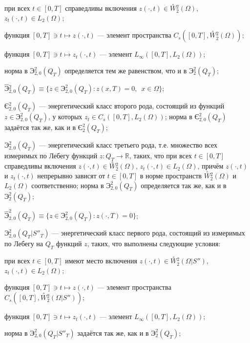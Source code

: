 \documentclass{report}
\begin{document}
при всех $t\in[0,T]$ справедливы включения $z(\cdot,t)\in\stackrel{\circ}{W}\!\!^2_2(\Omega)$, $z_t(\cdot,t)\in L_2(\Omega)$;

функция $[0,T]\ni t\mapsto z(\cdot,t)$ --- элемент пространства $C_s([0,T],\stackrel{\circ}{W}\!\!^2_2(\Omega))$;

функция  $[0,T]\ni t\mapsto z_t(\cdot,t)$ --- элемент $L_\infty([0,T],L_2(\Omega))$;

\noindent норма в  $\textrm{Э}^{2}_{2,0}(Q_T)$ определяется тем же равенством, что и в $\textrm{Э}^{2}_{2}(Q_T)$;


$\hat{\textrm{Э}}{}^{2}_{2,0}(Q_T)\equiv\{z\in \textrm{Э}^{2}_{2,0}(Q_T):z(x,T)=0,\,\,\,x\in\Omega\}$;


$\textrm{Є}^{2}_{2,0}(Q_T)$ --- \glqq энергетический класс второго рода\grqq, состоящий из функций $z\in \textrm{Э}^{2}_{2,0}(Q_T)$, у которых
$z_t\in C_s([0,T],L_2(\Omega))$; норма в $\textrm{Є}^{2}_{2,0}(Q_T)$ задаётся так же, как и в $\textrm{Є}^{2}_{2}(Q_T)$;


$\textbf{Э}^{2}_{2,0}(Q_T)$ --- \glqq энергетический класс третьего рода\grqq, т.е. множество всех измеримых по Лебегу функций $z\colon Q_T\to \mathbb{R}$, таких, что при всех $t\in[0,T]$
справедливы включения $z(\cdot,t)\in\stackrel{\circ}{W}\!\!\!^2_2(\Omega)$, $z_t(\cdot,t)\in L_2(\Omega)$, причём $z(\cdot,t)$ и $z_t(\cdot,t)$ непрерывно зависят от $t\in[0,T]$ в норме
пространств $\stackrel{\circ}{W}\!\!\!^2_2(\Omega)$ и $L_2(\Omega)$ соответственно; норма в $\textbf{Э}^{2}_{2,0}(Q_T)$ определяется так же, как и в $\textbf{Э}^{2}_{2}(Q_T)$;


$\hat{\textbf{Э}}^{2}_{2,0}(Q_T)\equiv\{z\in\textbf{Э}^{2}_{2,0}(Q_T):z(\cdot,T)=0\}$;


$\textrm{Э}^{2}_{2,0}(Q_T|S''_T)$ --- \glqq энергетический класс первого рода\grqq, состоящий из измеримых по Лебегу на $Q_T$ функций $z$, таких, что выполнены следующие условия:

при всех $t\in[0,T]$ имеют место включения $z(\cdot,t)\in\stackrel{\circ}{W}\!\!^2_2(\Omega|S'')$, $z_t(\cdot,t)\in L_2(\Omega)$;

функция $[0,T]\ni t\mapsto z(\cdot,t)$ --- элемент пространства $C_s([0,T],\stackrel{\circ}{W}\!\!^2_2(\Omega|S''))$;

функция  $[0,T]\ni t\mapsto z_t(\cdot,t)$ --- элемент $L_\infty([0,T],L_2(\Omega))$;

\noindent норма в  $\textrm{Э}^{2}_{2,0}(Q_T|S''_T)$ задаётся так же, как и в  $\textrm{Э}^{2}_{2}(Q_T)$;
\end{document}
